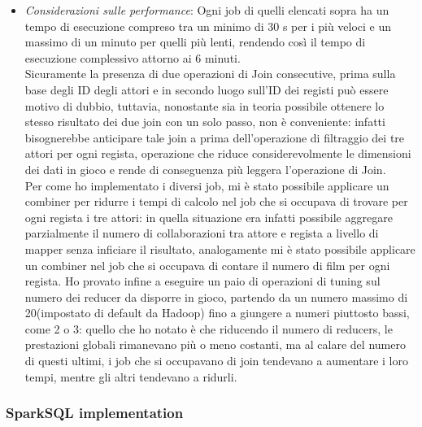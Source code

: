 \documentclass[hidelinks]{article}
\begin{document}
\begin{itemize}
\begin{itemize}
		
	\end{itemize}
	\item \textit{Considerazioni sulle performance}: Ogni job di quelli elencati sopra ha un tempo di esecuzione compreso tra un minimo di 30 s per i più veloci e un massimo di un minuto per quelli più lenti, rendendo così il tempo di esecuzione complessivo attorno ai 6 minuti.\\
	Sicuramente la presenza di due operazioni di Join consecutive, prima sulla base degli ID degli attori e in secondo luogo sull'ID dei registi può essere motivo di dubbio, tuttavia, nonostante sia in teoria possibile ottenere lo stesso risultato dei due join con un solo passo, non è conveniente: infatti bisognerebbe anticipare tale join a prima dell'operazione di filtraggio dei tre attori per ogni regista, operazione che riduce considerevolmente le dimensioni dei dati in gioco e rende di conseguenza più leggera l'operazione di Join.\\
	Per come ho implementato i diversi job, mi è stato possibile applicare un combiner per ridurre i tempi di calcolo nel job che si occupava di trovare per ogni regista i tre attori: in quella situazione era infatti possibile aggregare parzialmente il numero di collaborazioni tra attore e regista a livello di mapper senza inficiare il risultato, analogamente mi è stato possibile applicare un combiner nel job che si occupava di contare il numero di film per ogni regista.
	Ho provato infine a eseguire un paio di operazioni di tuning sul numero dei reducer da disporre in gioco, partendo da un numero massimo di 20(impostato di default da Hadoop) fino a giungere a numeri piuttosto bassi, come 2 o 3: quello che ho notato è che riducendo il numero di reducers, le prestazioni globali rimanevano più o meno costanti, ma al calare del numero di questi ultimi, i job che si occupavano di join tendevano a aumentare i loro tempi, mentre gli altri tendevano a ridurli. 
\end{itemize}

\subsubsection{SparkSQL implementation}
\end{document}
